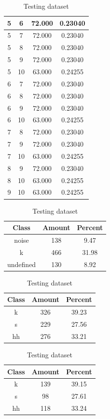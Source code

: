 \begin{table}
\begin{subtable}[tbp]{0.45\textwidth}
{\begin{tabular}{|c|c|c|c|}
 5 & 6 & 72.000 & 0.23040\\ \hline 
 5 & 7 & 72.000 & 0.23040\\ \hline 
 5 & 8 & 72.000 & 0.23040\\ \hline 
 5 & 9 & 72.000 & 0.23040\\ \hline 
 5 & 10 & 63.000 & 0.24255\\ \hline 
 6 & 7 & 72.000 & 0.23040\\ \hline 
 6 & 8 & 72.000 & 0.23040\\ \hline 
 6 & 9 & 72.000 & 0.23040\\ \hline 
 6 & 10 & 63.000 & 0.24255\\ \hline 
 7 & 8 & 72.000 & 0.23040\\ \hline 
 7 & 9 & 72.000 & 0.23040\\ \hline 
 7 & 10 & 63.000 & 0.24255\\ \hline 
 8 & 9 & 72.000 & 0.23040\\ \hline 
 8 & 10 & 63.000 & 0.24255\\ \hline 
 9 & 10 & 63.000 & 0.24255\\ \hline 

\end{tabular}
} \label{xlsskew105}
\caption{xcsskew105}
\end{subtable}

\begin{subtable}[tbp]{0.45\textwidth}
\centering
\begin{tabular}{|c|c|c|}
\hline
Class & Amount & Percent\\ \hline
noise & 138 & 9.47\\ \hline
k & 466 & 31.98\\ \hline
undefined & 130 & 8.92\\ \hline
\end{tabular}
\caption{Entire dataset after stripping short sounds}
\end{subtable}
\hfill
\begin{subtable}[tbp]{0.45\textwidth}
\centering
\begin{tabular}{|c|c|c|}
\hline
Class & Amount & Percent\\ \hline
k & 326 & 39.23\\ \hline
s & 229 & 27.56\\ \hline
hh & 276 & 33.21\\ \hline
\end{tabular}
\caption{Training dataset}
\end{subtable}
\hfill
\begin{subtable}[tbp]{0.45\textwidth}
\centering
\begin{tabular}{|c|c|c|}
\hline
Class & Amount & Percent\\ \hline
k & 139 & 39.15\\ \hline
s & 98 & 27.61\\ \hline
hh & 118 & 33.24\\ \hline
\end{tabular}
\caption{Testing dataset}
\end{subtable}
\hfill


\end{table}

